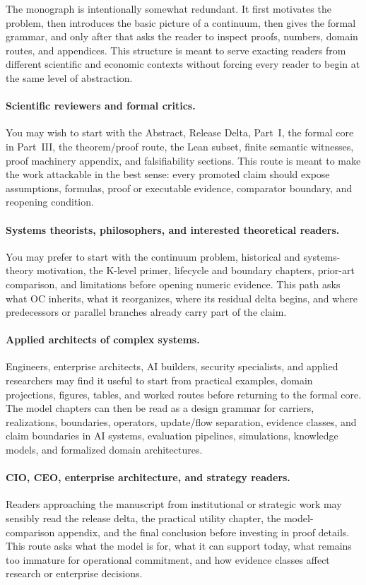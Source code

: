 The monograph is intentionally somewhat redundant. It first motivates the
problem, then introduces the basic picture of a continuum, then gives the
formal grammar, and only after that asks the reader to inspect proofs, numbers,
domain routes, and appendices. This structure is meant to serve exacting
readers from different scientific and economic contexts without forcing every
reader to begin at the same level of abstraction.

\paragraph{Scientific reviewers and formal critics.}
You may wish to start with the Abstract, Release Delta, Part~I, the formal core
in Part~III, the theorem/proof route, the Lean subset, finite semantic
witnesses, proof machinery appendix, and falsifiability sections. This route is
meant to make the work attackable in the best sense: every promoted claim
should expose assumptions, formulas, proof or executable evidence, comparator
boundary, and reopening condition.

\paragraph{Systems theorists, philosophers, and interested theoretical readers.}
You may prefer to start with the continuum problem, historical and systems-
theory motivation, the K-level primer, lifecycle and boundary chapters,
prior-art comparison, and limitations before opening numeric evidence. This
path asks what OC inherits, what it reorganizes, where its residual delta
begins, and where predecessors or parallel branches already carry part of the
claim.

\paragraph{Applied architects of complex systems.}
Engineers, enterprise architects, AI builders, security specialists, and
applied researchers may find it useful to start from practical examples,
domain projections, figures, tables, and worked routes before returning to the
formal core. The model chapters can then be read as a design grammar for
carriers, realizations, boundaries, operators, update/flow separation, evidence
classes, and claim boundaries in AI systems, evaluation pipelines, simulations,
knowledge models, and formalized domain architectures.

\paragraph{CIO, CEO, enterprise architecture, and strategy readers.}
Readers approaching the manuscript from institutional or strategic work may
sensibly read the release delta, the practical utility chapter, the
model-comparison appendix, and the final conclusion before investing in proof
details. This route asks what the model is for, what it can support today, what
remains too immature for operational commitment, and how evidence classes
affect research or enterprise decisions.

